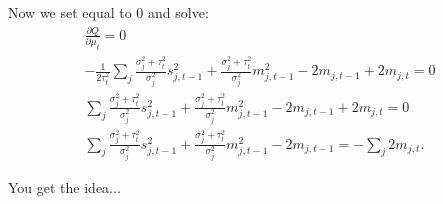 \documentclass[a4paper,11pt]{article}
\begin{document}
Now we set equal to 0 and solve:
\begin{align*}
    \frac{ \partial Q }{ \partial\mu_t } = 0 \\
    -\frac1{ 2 \tau_t^2 } \sum\limits_j 
    \frac{ \sigma_j^2 + \tau_t^2 }{ \sigma_j^2 } s_{j,t-1}^2
    + \frac{ \sigma_j^2 + \tau_t^2 }{ \sigma_j^2 } m_{j,t-1}^2
    - 2 m_{j,t-1}
    + 2 m_{j,t} = 0 \\
    \sum\limits_j 
    \frac{ \sigma_j^2 + \tau_t^2 }{ \sigma_j^2 } s_{j,t-1}^2
    + \frac{ \sigma_j^2+\tau_t^2 }{ \sigma_j^2 } m_{j,t-1}^2
    - 2 m_{j,t-1}
    + 2 m_{j,t} = 0 \\
    \sum\limits_j 
    \frac{ \sigma_j^2 + \tau_t^2 }{ \sigma_j^2 } s_{j,t-1}^2
    + \frac{ \sigma_j^2 + \tau_t^2 }{ \sigma_j^2 } m_{j,t-1}^2
    - 2 m_{j,t-1} = 
    - \sum\limits_j 2 m_{j,t}.
\end{align*}

You get the idea...
\end{document}
